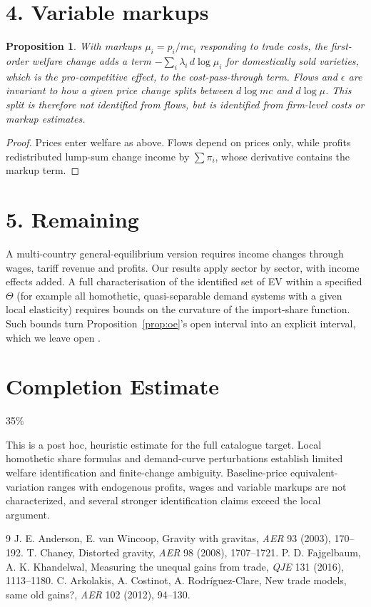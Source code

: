 \documentclass[11pt]{article}
\newtheorem{proposition}[theorem]{Proposition}
\theoremstyle{definition}
\begin{document}
\section*{4. Variable markups}
\begin{proposition}\label{prop:mk}
With markups $\mu_i=p_i/mc_i$ responding to trade costs, the first-order welfare change adds a term
$-\sum_i\lambda_i\,d\log\mu_i$ for domestically sold varieties, which is the pro-competitive effect, to the
cost-pass-through term. Flows and $\epsilon$ are invariant to how a given price change splits between $d\log mc$ and
$d\log\mu$. This split is therefore not identified from flows, but is identified from firm-level costs or markup estimates.
\end{proposition}
\begin{proof}
Prices enter welfare as above. Flows depend on prices only, while profits redistributed lump-sum change income by
$\sum\pi_i$, whose derivative contains the markup term.
\end{proof}

\section*{5. Remaining}
A multi-country general-equilibrium version requires income changes through wages, tariff revenue and profits. Our
results apply sector by sector, with income effects added. A full characterisation of the identified set of EV within a
specified $\Theta$ (for example all homothetic, quasi-separable demand systems with a given local elasticity) requires bounds
on the curvature of the import-share function. Such bounds turn Proposition~\ref{prop:oe}'s open interval into an explicit
interval, which we leave open \cite{av,chaney,fk}.

\section{Completion Estimate}
35\%

This is a post hoc, heuristic estimate for the full catalogue target.
Local homothetic share formulas and demand-curve perturbations establish limited welfare identification and finite-change ambiguity. Baseline-price equivalent-variation ranges with endogenous profits, wages and variable markups are not characterized, and several stronger identification claims exceed the local argument.

\begin{thebibliography}{9}
 J. E. Anderson, E. van Wincoop, Gravity with gravitas, \emph{AER} 93 (2003), 170--192.
 T. Chaney, Distorted gravity, \emph{AER} 98 (2008), 1707--1721.
 P. D. Fajgelbaum, A. K. Khandelwal, Measuring the unequal gains from trade, \emph{QJE} 131 (2016), 1113--1180.
 C. Arkolakis, A. Costinot, A. Rodr\'iguez-Clare, New trade models, same old gains?, \emph{AER} 102 (2012), 94--130.
\end{thebibliography}
\end{document}
